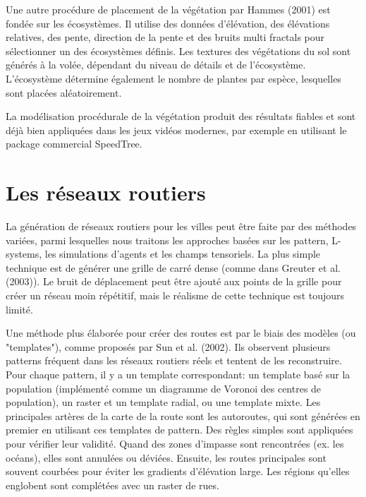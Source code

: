 \documentclass[11pt]{report}
\begin{document}
Une autre procédure de placement de la végétation par Hammes (2001) est fondée sur les écosystèmes. Il utilise des données d'élévation, des élévations relatives, des pente, direction de la pente et des bruits multi fractals pour sélectionner un des écosystèmes définis. Les textures des végétations du sol sont générés à la volée, dépendant du niveau de détails et de l'écosystème. L'écosystème détermine également le nombre de plantes par espèce, lesquelles sont placées aléatoirement. \newline

La modélisation procédurale de la végétation produit des résultats fiables et sont déjà bien appliquées dans les jeux vidéos modernes, par exemple en utilisant le package commercial SpeedTree.

\section{Les réseaux routiers}

La génération de réseaux routiers pour les villes peut être faite par des méthodes variées, parmi lesquelles nous traitons les approches basées sur les pattern, L-systems, les simulations d'agents et les champs tensoriels. La plus simple technique est de générer une grille de carré dense (comme dans Greuter et al. (2003)). Le bruit de déplacement peut être ajouté aux points de la grille pour créer un réseau moin répétitif, mais le réalisme de cette technique est toujours limité. \newline

Une méthode plus élaborée pour créer des routes est par le biais des modèles (ou "templates"), comme proposés par Sun et al. (2002). Ils observent plusieurs patterns fréquent dans les réseaux routiers réels et tentent de les reconstruire. Pour chaque pattern, il y a un template correspondant: un template basé sur la population (implémenté comme un diagramme de Voronoi des centres de population), un raster et un template radial, ou une template mixte. Les principales artères de la carte de la route sont les autoroutes, qui sont générées en premier en utilisant ces templates de pattern. Des règles simples sont appliquées pour vérifier leur validité. Quand des zones d'impasse sont rencontrées (ex. les océans), elles sont annulées ou déviées. Ensuite, les routes principales sont souvent courbées pour éviter les gradients d'élévation large. Les régions qu'elles englobent sont complétées avec un raster de rues. \newline
\end{document}
